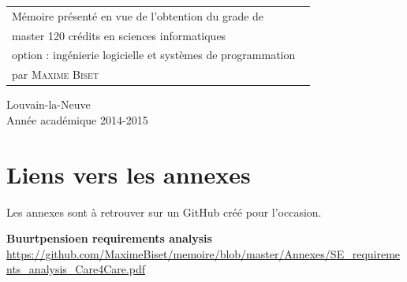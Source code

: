 \documentclass[british]{article}
\renewcommand\title{Analyse et développement d'un framework open source d'online banking pour des organisations d'échange social en monnaies complémentaires}
\newcommand\name{\textsc{Maxime Biset}}
\newcommand\years{2014-2015}
\begin{document}
\begin{minipage}{.5\textwidth}
\begin{tabular}{l}
Mémoire présenté en vue de l'obtention du grade de
\\ master 120 crédits en sciences informatiques
\\ option : ingénierie logicielle et systèmes de programmation \
\\ par \name \
\end{tabular}
\end{minipage}
\vfill
\begin{center}
Louvain-la-Neuve
\\ Année académique \years
\end{center}





\newpage



\newpage
\tableofcontents
\newpage
{}



















\newpage

\nocite{*}


\appendix

\section{Liens vers les annexes}
Les annexes sont à retrouver sur un GitHub créé pour l'occasion.

\textbf{Buurtpensioen requirements analysis}\\
\label{bpse}
\url{https://github.com/MaximeBiset/memoire/blob/master/Annexes/SE_requirements_analysis_Care4Care.pdf}
\end{document}
